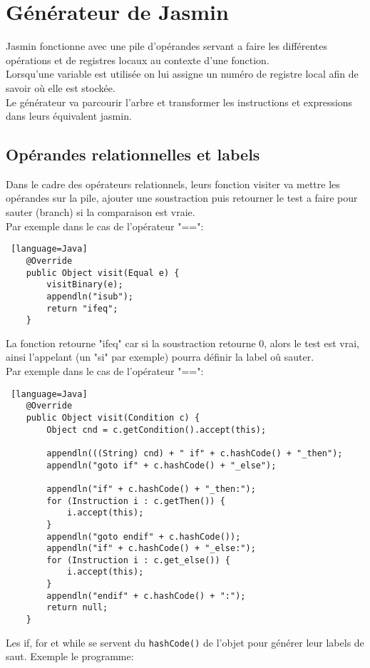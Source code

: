 \documentclass{article}
\begin{document}
\section{Générateur de Jasmin}
Jasmin fonctionne avec une pile d'opérandes servant a faire les différentes opérations et de registres locaux au contexte d'une fonction.\\
Lorsqu'une variable est utilisée on lui assigne un numéro de registre local afin de savoir où elle est stockée. \\
Le générateur va parcourir l'arbre et transformer les instructions et expressions dans leurs équivalent jasmin. \\
\subsection{Opérandes relationnelles et labels}
Dans le cadre des opérateurs relationnels, leurs fonction visiter va mettre les opérandes sur la pile, ajouter une soustraction puis retourner le test a faire pour sauter (branch) si la comparaison est vraie. \\
Par exemple dans le cas de l'opérateur "==":
\begin{lstlisting} [language=Java]
	@Override
	public Object visit(Equal e) {
		visitBinary(e);
		appendln("isub");
		return "ifeq";
	}
\end{lstlisting}
La fonction retourne "ifeq" car si la soustraction retourne 0, alors le test est vrai, ainsi l'appelant (un "si" par exemple) pourra définir la label oû sauter.\\
Par exemple dans le cas de l'opérateur "==":
\begin{lstlisting} [language=Java]
	@Override
	public Object visit(Condition c) {
		Object cnd = c.getCondition().accept(this);

		appendln(((String) cnd) + " if" + c.hashCode() + "_then");
		appendln("goto if" + c.hashCode() + "_else");

		appendln("if" + c.hashCode() + "_then:");
		for (Instruction i : c.getThen()) {
			i.accept(this);
		}
		appendln("goto endif" + c.hashCode());
		appendln("if" + c.hashCode() + "_else:");
		for (Instruction i : c.get_else()) {
			i.accept(this);
		}
		appendln("endif" + c.hashCode() + ":");
		return null;
	}
\end{lstlisting}
Les if, for et while se servent du \verb+hashCode()+ de l'objet pour générer leur labels de saut.
Exemple le programme:
\end{document}
